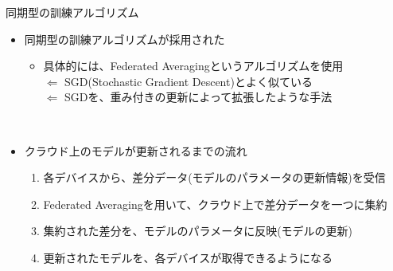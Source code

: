 \documentclass[dvipdfmx,notheorems,t]{beamer}
\begin{document}
\begin{frame}{同期型の訓練アルゴリズム}

\begin{itemize}
	\item \alert{同期型}の訓練アルゴリズムが採用された
	\begin{itemize}
		\item 具体的には、\alert{Federated Averaging}というアルゴリズムを使用 \\
		$\Leftarrow$ SGD(Stochastic Gradient Descent)とよく似ている \\
		$\Leftarrow$ SGDを、重み付きの更新によって拡張したような手法
	\end{itemize} \
	
	\item クラウド上のモデルが更新されるまでの流れ
	\begin{enumerate}
		\item 各デバイスから、差分データ(モデルのパラメータの更新情報)を受信
		\newline
		\item \alert{Federated Averaging}を用いて、クラウド上で差分データを一つに集約
		\newline
		\item 集約された差分を、モデルのパラメータに反映(モデルの更新)
		\newline
		\item 更新されたモデルを、各デバイスが取得できるようになる
	\end{enumerate}
\end{itemize}

\end{frame}
\end{document}

